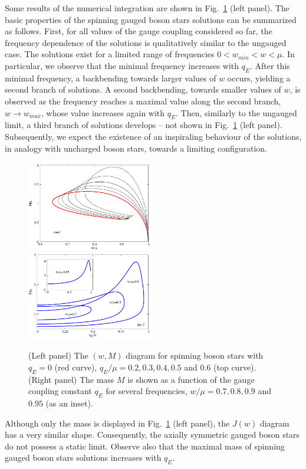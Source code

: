 \documentclass{article}
\begin{document}
Some results of the numerical integration are shown in Fig.~\ref{fig:w-M-gauged} (left panel).
The basic properties of the spinning gauged boson stars solutions can be summarized as follows.
First, for all values of the gauge coupling considered so far, 
the frequency dependence of the solutions is qualitatively similar to the ungauged case.
The solutions 
exist for a limited range of frequencies
$0<w_{min}<w<\mu$. 
In particular, we observe that the minimal frequency increases with $q_E$. 
After this minimal frequency, a backbending towards larger values of $w$ occurs, yielding a second branch of solutions. 
A second backbending, towards
smaller values of $w$,  is observed as the frequency reaches a maximal value along the second branch, $w\to w_{max}$, whose value increases again with $q_E$. 
Then, similarly to the ungauged limit, a third branch of solutions develops -- not shown in Fig.~\ref{fig:w-M-gauged} (left panel).
Subsequently, we expect the existence of an inspiraling behaviour of the solutions, 
in analogy with uncharged boson stars, towards a limiting configuration.  


\begin{figure}[H]
  \begin{center}
    \includegraphics[width=0.497\textwidth]{BS-w-M-gauged}
      \includegraphics[width=0.497\textwidth]{BS-g-M-gauged}
  \end{center}
  \caption{
	(Left panel)
	The $(w,M)$ diagram for spinning boson stars with $q_E=0$ (red curve), $q_E/\mu=0.2, 0.3, 0.4, 0.5$
	and $0.6$ (top curve).  
		(Right panel)
	The mass $M$ is shown as a function of the gauge coupling constant $q_E$
	for several frequencies, $w/\mu=0.7, 0.8, 0.9$ and $0.95$ (as an inset).	}
  \label{fig:w-M-gauged}
\end{figure}
Although only the mass is displayed in Fig.~\ref{fig:w-M-gauged} (left panel), the $J(w)$
diagram has a very similar shape.
Consequently,  the axially symmetric gauged boson stars do not possess
a static limit.  Observe also that the maximal mass of spinning gauged boson stars solutions increases with $q_E$.
\end{document}
